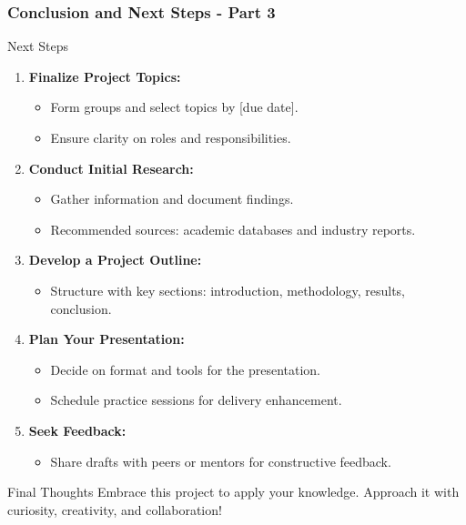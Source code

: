 \documentclass[aspectratio=169]{beamer}
\begin{document}
\begin{frame}[fragile]
  \frametitle{Conclusion and Next Steps - Part 3}
  \begin{block}{Next Steps}
    \begin{enumerate}
      \item \textbf{Finalize Project Topics:}
        \begin{itemize}
          \item Form groups and select topics by [due date].
          \item Ensure clarity on roles and responsibilities.
        \end{itemize}
      \item \textbf{Conduct Initial Research:}
        \begin{itemize}
          \item Gather information and document findings.
          \item Recommended sources: academic databases and industry reports.
        \end{itemize}
      \item \textbf{Develop a Project Outline:}
        \begin{itemize}
          \item Structure with key sections: introduction, methodology, results, conclusion.
        \end{itemize}
      \item \textbf{Plan Your Presentation:}
        \begin{itemize}
          \item Decide on format and tools for the presentation.
          \item Schedule practice sessions for delivery enhancement.
        \end{itemize}
      \item \textbf{Seek Feedback:}
        \begin{itemize}
          \item Share drafts with peers or mentors for constructive feedback.
        \end{itemize}
    \end{enumerate}
  \end{block}

  \begin{block}{Final Thoughts}
    Embrace this project to apply your knowledge. Approach it with curiosity, creativity, and collaboration!
  \end{block}
\end{frame}
\end{document}
